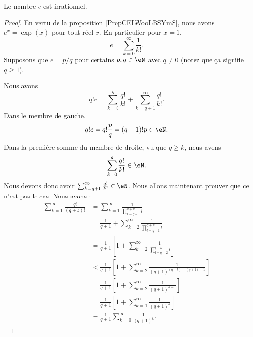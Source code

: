 \begin{proposition}     \label{PROPooFRKUooZyhHIC}
    Le nombre \( e\) est irrationnel.
\end{proposition}

\begin{proof}
    En vertu de la proposition \ref{PropCELWooLBSYmS}, nous avons \( e^x=\exp(x)\) pour tout réel \( x\). En particulier pour \( x=1\),
    \begin{equation}
        e=\sum_{k=0}^{\infty}\frac{1}{ k! }.
    \end{equation}
    Supposons que \( e=p/q\) pour certains \( p,q\in \eN\) avec \( q\neq 0\) (notez que ça signifie \( q\geq 1\)).

    Nous avons
    \begin{equation}
        q!e=\sum_{k=0}^q\frac{ q! }{ k! }+\sum_{k=q+1}^{\infty}\frac{ q! }{ k! }.
    \end{equation}
    Dans le membre de gauche, 
    \begin{equation}
        q!e=q!\frac{ p }{ q }=(q-1)!p\in \eN.
    \end{equation}
    Dans la première somme du membre de droite, vu que \( q\geq k\), nous avons
    \begin{equation}
        \sum_{k=0}^q\frac{ q! }{ k! }\in \eN.
    \end{equation}
    Nous devons donc avoir \( \sum_{k=q+1}^{\infty}\frac{ q! }{ k! }\in \eN\). Nous allons maintenant prouver que ce n'est pas le cas. Nous avons :
    \begin{subequations}
        \begin{align}
            \sum_{k=1}^{\infty}\frac{ q! }{ (q+k)! }&=\sum_{k=1}^{\infty}\frac{1}{ \prod_{l=q+1}^{q+k}l }\\
            &=\frac{1}{ q+1 }+\sum_{k=2}^{\infty}\frac{1}{ \prod_{l=q+1}^{q+k}l }\\
        &=\frac{1}{ q+1 }\left[ 1+\sum_{k=2}^{\infty}\frac{1}{ \prod_{l=q+2}^{q+k}l } \right]\\
    &<\frac{1}{ q+1 }\left[ 1+\sum_{k=2}^{\infty}\frac{1}{ (q+1)^{(q+k)-(q+2)+1} } \right]\\
&=\frac{1}{ q+1 }\left[ 1+\sum_{k=2}^{\infty}\frac{1}{ (q+1)^{k-1} } \right]\\
&=\frac{1}{ q+1 }\left[ 1+\sum_{k=1}^{\infty}\frac{1}{ (q+1)^k } \right]\\
&=\frac{1}{ q+1 }\sum_{k=0}^{\infty}\frac{1}{ (q+1)^k }.
        \end{align}
    \end{subequations}

\end{proof}
